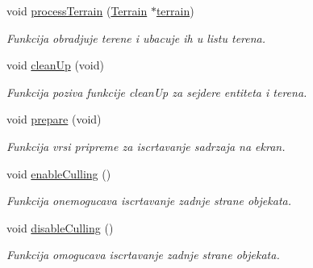\begin{DoxyCompactItemize}
void \hyperlink{classcore_1_1MainRenderer_a4e8a3e6729a7d948761d6e74c48a6236}{process\+Terrain} (\hyperlink{classterrain_1_1Terrain}{Terrain} $\ast$\hyperlink{namespacecore_ac45da6f80dac9bead5c9310c27897f15}{terrain})
\begin{DoxyCompactList}\small\item\em Funkcija obradjuje terene i ubacuje ih u listu terena. \end{DoxyCompactList}\item 
void \hyperlink{classcore_1_1MainRenderer_af55caf59bc4f10718a18ecb3e784b778}{clean\+Up} (void)
\begin{DoxyCompactList}\small\item\em Funkcija poziva funkcije clean\+Up za sejdere entiteta i terena. \end{DoxyCompactList}\item 
void \hyperlink{classcore_1_1MainRenderer_a8e8be03c3b1f51ce0721cf52aa8f0f3c}{prepare} (void)
\begin{DoxyCompactList}\small\item\em Funkcija vrsi pripreme za iscrtavanje sadrzaja na ekran. \end{DoxyCompactList}\item 
void \hyperlink{classcore_1_1MainRenderer_abf659aace3015f29db1c3ea9561fff2f}{enable\+Culling} ()
\begin{DoxyCompactList}\small\item\em Funkcija onemogucava iscrtavanje zadnje strane objekata. \end{DoxyCompactList}\item 
void \hyperlink{classcore_1_1MainRenderer_a00a3d49faabb02f0984f521208681ac4}{disable\+Culling} ()
\begin{DoxyCompactList}\small\item\em Funkcija omogucava iscrtavanje zadnje strane objekata. \end{DoxyCompactList}\end{DoxyCompactItemize}

